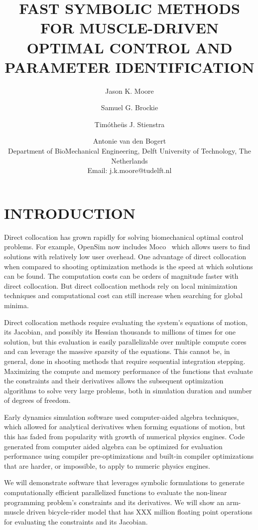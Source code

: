 \documentclass[11pt,twocolumn]{article}
\title{\textbf{
  FAST SYMBOLIC METHODS FOR MUSCLE-DRIVEN\\
  OPTIMAL CONTROL AND PARAMETER IDENTIFICATION
}}
\author{
Jason K. Moore \and
Samuel G. Brockie \and
Timótheüs J. Stienstra \and
Antonie van den Bogert \\
Department of BioMechanical Engineering, Delft University of Technology, The Netherlands\\
Email: j.k.moore@tudelft.nl}
\date{}
\begin{document}
\pagestyle{fancy}
\lhead{}
\maketitle
\section*{INTRODUCTION}
%
Direct collocation has grown rapidly for solving biomechanical optimal control
problems. For example, OpenSim now includes Moco~\cite{Dembia2019} which allows
users to find solutions with relatively low user overhead. One advantage of
direct collocation when compared to shooting optimization methods is the speed
at which solutions can be found. The computation costs can be orders of
magnitude faster with direct collocation. But direct collocation methods rely on
local minimization techniques and computational cost can still increase when
searching for global minima.

Direct collocation methods require evaluating the system's equations of motion,
its Jacobian, and possibly its Hessian thousands to millions of times for one
solution, but this evaluation is easily parallelizable over multiple compute
cores and can leverage the massive sparsity of the equations. This cannot be, in
general, done in shooting methods that require sequential integration stepping.
Maximizing the compute and memory performance of the functions that evaluate the
constraints and their derivatives allows the subsequent optimization algorithms
to solve very large problems, both in simulation duration and number of degrees
of freedom.

Early dynamics simulation software used computer-aided algebra techniques, which
allowed for analytical derivatives when forming equations of motion, but this
has faded from popularity with growth of numerical physics engines. Code
generated from computer aided algebra can be optimized for evaluation
performance using compiler pre-optimizations and built-in compiler optimizations
that are harder, or impossible, to apply to numeric physics engines.

We will demonstrate software that leverages symbolic formulations to generate
computationally efficient parallelized functions to evaluate the non-linear
programming problem's constraints and its derivatives. We will show an
arm-muscle driven bicycle-rider model that has XXX million floating point
operations for evaluating the constraints and its Jacobian.
\end{document}
